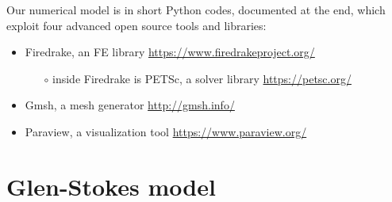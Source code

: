 \documentclass[letterpaper,final,12pt,reqno]{amsart}
\begin{document}
Our numerical model is in short Python codes, documented at the end, which exploit four advanced open source tools and libraries:
\begin{itemize}
\item Firedrake, an FE library \hfill \url{https://www.firedrakeproject.org/}
    \begin{itemize}
    \item[$\circ$] inside Firedrake is PETSc, a solver library \hfill \url{https://petsc.org/}
    \end{itemize}
\item Gmsh, a mesh generator \hfill \url{http://gmsh.info/}
\item Paraview, a visualization tool \hfill \url{https://www.paraview.org/}
\end{itemize}


\section{Glen-Stokes model} \label{sec:stokes}
\end{document}
